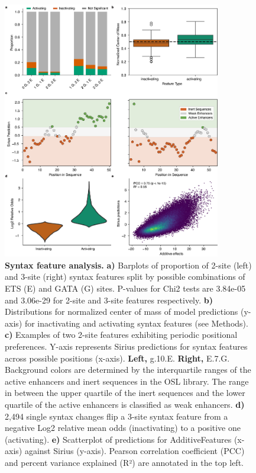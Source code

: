 \begin{figure}[p]
    \centering
    \includegraphics[width=0.85\textwidth]{2_figures-and-files/SuppFig9.png}
    \caption[Syntax feature analysis.]{\textbf{Syntax feature analysis.} \textbf{a)} Barplots of proportion of 2-site (left) and 3-site (right) syntax features split by possible combinations of ETS (E) and GATA (G) sites. P-values for Chi2 tests are 3.84e-05 and 3.06e-29 for 2-site and 3-site features respectively. \textbf{b)} Distributions for normalized center of mass of model predictions (y-axis) for inactivating and activating syntax features (see Methods). \textbf{c)} Examples of two 2-site features exhibiting periodic positional preferences. Y-axis represents Sirius predictions for syntax features across possible positions (x-axis). \textbf{Left,} g.10.E. \textbf{Right,} E.7.G. Background colors are determined by the interquartile ranges of the active enhancers and inert sequences in the OSL library. The range in between the upper quartile of the inert sequences and the lower quartile of the active enhancers is classified as weak enhancers. \textbf{d)} 2,494 single syntax changes flip a 3-site syntax feature from a negative Log2 relative mean odds (inactivating) to a positive one (activating). \textbf{e)} Scatterplot of predictions for AdditiveFeatures (x-axis) against Sirius (y-axis). Pearson correlation coefficient (PCC) and percent variance explained (R²) are annotated in the top left.}
    \label{fig:2 supplementary_9}
\end{figure}

